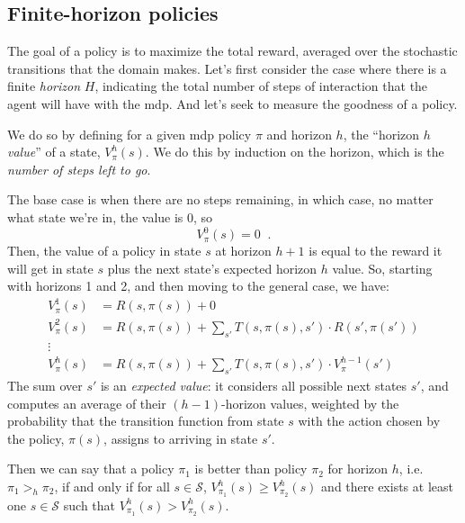 \subsection{Finite-horizon policies}

\label{sec:mdp_finite_horizon}

The goal of a policy is to maximize the total reward, averaged over
the stochastic transitions that the domain makes.  Let's first
consider the case where there is a finite {\em horizon} $H$,
indicating the total number of steps of interaction that the agent
will have with the {\sc mdp}.  And let's seek to measure the goodness of a
policy.

We do so by defining for a given {\sc mdp} policy $\pi$ and horizon
$h$, the ``horizon $h$ {\em value}'' of a state, $V^{h}_\pi(s)$.  We
do this by induction on the horizon, which is the {\em number of steps
  left to go}.

The base case is when there are no steps remaining, in which case, no
matter what state we're in, the value is 0,  so
\begin{equation*}
V^0_{\pi}(s) = 0\;\;.
\end{equation*}
Then, the value of a policy in state $s$ at horizon $h + 1$ is equal
to the reward it will get in state $s$ plus the next state's expected horizon $h$
value.  So, starting with horizons 1 and 2, and then
moving to the general case, we have:
\begin{align}
V^1_{\pi}(s) &= R(s, \pi(s)) + 0\\
V^2_{\pi}(s) &= R(s, \pi(s)) + \sum_{s'}T(s, \pi(s), s') \cdot R(s', \pi(s'))\\
\vdots\\
V^h_{\pi}(s) &= R(s, \pi(s)) + \sum_{s'}T(s, \pi(s), s') \cdot V^{h - 1}_{\pi}(s')
\label{eq:finite_value}
\end{align}
The sum over $s'$ is an {\em expected value}:  it considers all
possible next states $s'$, and computes an average of their
$(h-1)$-horizon values, weighted by the probability that the transition
function from state $s$ with the action chosen by the policy,
$\pi(s)$, assigns to arriving in state $s'$.

Then we can say that a policy $\pi_1$ is better than policy $\pi_2$ for horizon
$h$, i.e. $\pi_1 >_h \pi_2$, if and only if for all $s \in \mathcal S$,
$V_{\pi_1}^h(s) \geq V_{\pi_2}^h(s)$ and there exists at least one $s
\in \mathcal S$ such that $V_{\pi_1}^h(s) > V_{\pi_2}^h(s)$.

